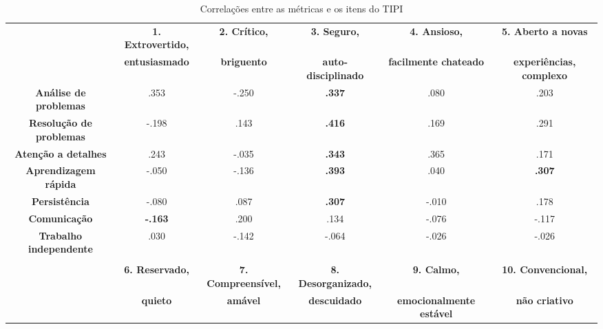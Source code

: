 \begin{sidewaystable}[ph!]
\footnotesize
\caption{\small Correlações entre as métricas e os itens do TIPI}
\addtolength{\tabcolsep}{1pt}
\centering
\begin{tabular}{lccccc}

    \toprule		
		& \textbf{1. Extrovertido, }  & \textbf{2. Crítico, } & \textbf{3. Seguro, } 			 & \textbf{4. Ansioso, } 				& \textbf{5. Aberto a novas } \\
		& \textbf{entusiasmado} 			& \textbf{briguento} 		& \textbf{auto-disciplinado} & \textbf{facilmente chateado} & \textbf{experiências, complexo} \\
					
    \midrule
    \multicolumn{1}{c}{\textbf{Análise de problemas}} 		& .353  				 & -.250 & \textbf{.337} & .080  & .203 				 \\
    \multicolumn{1}{c}{\textbf{Resolução de problemas}}		& -.198  				 & .143  & \textbf{.416} & .169  & .291 				 \\
    \multicolumn{1}{c}{\textbf{Atenção a detalhes}} 			& .243  				 & -.035 & \textbf{.343} & .365  & .171 				 \\
    \multicolumn{1}{c}{\textbf{Aprendizagem rápida}} 			& -.050  				 & -.136 & \textbf{.393} & .040  & \textbf{.307} \\
    \multicolumn{1}{c}{\textbf{Persistência}} 						& -.080  				 & .087  & \textbf{.307} & -.010 & .178 				 \\
    \multicolumn{1}{c}{\textbf{Comunicação}} 							& \textbf{-.163} & .200  & .134  			   & -.076 & -.117 				 \\
    \multicolumn{1}{c}{\textbf{Trabalho independente}} 		& .030  				 & -.142 & -.064 				 & -.026 & -.026 				 \\ 
		
    \multicolumn{1}{c}{\textbf{}} & & & & &  \\
		
    \toprule
		& \textbf{6. Reservado, } & \textbf{7. Compreensível, } & \textbf{8. Desorganizado, } & \textbf{9. Calmo, } 						& \textbf{10. Convencional, } \\
		& \textbf{quieto} 				& \textbf{amável} 						& \textbf{descuidado}					& \textbf{emocionalmente estável} & \textbf{não criativo} \\ 
		

\end{tabular}
\end{sidewaystable}
